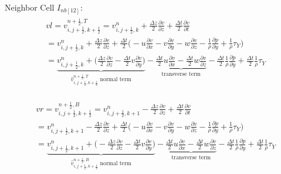 \documentclass{article}
\numberwithin{equation}{subsection}
\begin{document}
Neighbor Cell $I_{nb[12]}$:
\begin{align}
\begin{split}
& vl = v_{i,j+\frac{1}{2},k+\frac{1}{2}}^{n+\frac{1}{2},T} = v_{i,j+\frac{1}{2},k}^n + \frac{\Delta z}{2}\frac{\partial v}{\partial z} + \frac{\Delta t}{2}\frac{\partial v}{\partial t} \\
&= v_{i,j+\frac{1}{2},k}^n + \frac{\Delta z}{2} \frac{\partial v}{\partial z} + \frac{\Delta t}{2} \Big( -u\frac{\partial v}{\partial x} -v\frac{\partial v}{\partial y} -w\frac{\partial v}{\partial z} - \frac{1}{\rho}\frac{\partial p}{\partial y} +\frac{1}{\rho}\tau_Y\Big) \\
&= \underbrace{v_{i,j+\frac{1}{2},k}^n + \Big(\frac{\Delta z}{2}\frac{\partial v}{\partial z} - \frac{\Delta t}{2} v\frac{\partial v}{\partial y}\Big)}_\text{$\widehat{v}_{i,j+\frac{1}{2},k+\frac{1}{2}}^{n+\frac{1}{2},T}$ normal term} -\underbrace{\frac{\Delta t}{2}u\frac{\partial v}{\partial x} - \frac{\Delta t}{2}w\frac{\partial v}{\partial z}}_\text{transverse term} - \frac{\Delta t}{2}\frac{1}{\rho}\frac{\partial p}{\partial y} + \frac{\Delta t}{2}\frac{1}{\rho}\tau_Y
\end{split}
\end{align}

\begin{align}
\begin{split}
& vr = v_{i,j+\frac{1}{2},k+\frac{1}{2}}^{n+\frac{1}{2},B} = v_{i,j+\frac{1}{2},k+1}^n - \frac{\Delta z}{2}\frac{\partial v}{\partial z} + \frac{\Delta t}{2}\frac{\partial v}{\partial t} \\
&= v_{i,j+\frac{1}{2},k+1}^n - \frac{\Delta z}{2} \frac{\partial v}{\partial z} + \frac{\Delta t}{2} \Big( -u\frac{\partial v}{\partial x} -v\frac{\partial v}{\partial y} -w\frac{\partial v}{\partial z} - \frac{1}{\rho}\frac{\partial p}{\partial y} +\frac{1}{\rho}\tau_Y\Big) \\
&= \underbrace{v_{i,j+\frac{1}{2},k+1}^n + \Big(-\frac{\Delta z}{2}\frac{\partial v}{\partial z} - \frac{\Delta t}{2} v\frac{\partial v}{\partial y}\Big)}_\text{$\widehat{v}_{i,j+\frac{1}{2},k+\frac{1}{2}}^{n+\frac{1}{2},B}$ normal term} -\underbrace{\frac{\Delta t}{2}u\frac{\partial v}{\partial x} - \frac{\Delta t}{2}w\frac{\partial v}{\partial z}}_\text{transverse term} - \frac{\Delta t}{2}\frac{1}{\rho}\frac{\partial p}{\partial y} + \frac{\Delta t}{2}\frac{1}{\rho}\tau_Y
\end{split}
\end{align}
\end{document}
